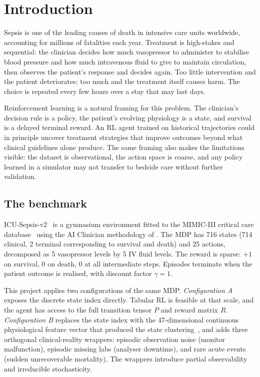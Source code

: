 \section{Introduction}
\label{sec:intro}

Sepsis is one of the leading causes of death in intensive care units worldwide, accounting for millions of fatalities each year. Treatment is high-stakes and sequential: the clinician decides how much vasopressor to administer to stabilise blood pressure and how much intravenous fluid to give to maintain circulation, then observes the patient's response and decides again. Too little intervention and the patient deteriorates; too much and the treatment itself causes harm. The choice is repeated every few hours over a stay that may last days.

Reinforcement learning is a natural framing for this problem. The clinician's decision rule is a policy, the patient's evolving physiology is a state, and survival is a delayed terminal reward. An RL agent trained on historical trajectories could in principle uncover treatment strategies that improve outcomes beyond what clinical guidelines alone produce. The same framing also makes the limitations visible: the dataset is observational, the action space is coarse, and any policy learned in a simulator may not transfer to bedside care without further validation.

\subsection{The benchmark}

ICU-Sepsis-v2~\citep{choudhary2024icusepsis} is a gymnasium environment fitted to the MIMIC-III critical care database~\citep{johnson2016mimic} using the AI Clinician methodology of \citet{komorowski2018ai}. The MDP has 716 states (714 clinical, 2 terminal corresponding to survival and death) and 25 actions, decomposed as 5 vasopressor levels by 5 IV fluid levels. The reward is sparse: $+1$ on survival, $0$ on death, $0$ at all intermediate steps. Episodes terminate when the patient outcome is realised, with discount factor $\gamma = 1$.

This project applies two configurations of the same MDP. \emph{Configuration A} exposes the discrete state index directly. Tabular RL is feasible at that scale, and the agent has access to the full transition tensor $P$ and reward matrix $R$. \emph{Configuration B} replaces the state index with the 47-dimensional continuous physiological feature vector that produced the state clustering~\citep{komorowski2018ai}, and adds three orthogonal clinical-reality wrappers: episodic observation noise (monitor malfunction), episodic missing labs (analyser downtime), and rare acute events (sudden unrecoverable mortality). The wrappers introduce partial observability and irreducible stochasticity.

